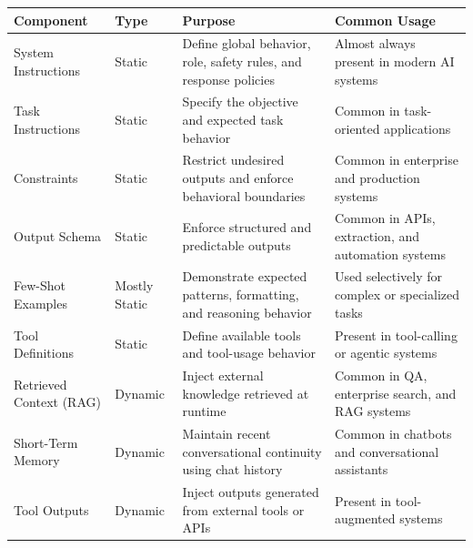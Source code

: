 \documentclass[10pt,a4paper]{article}
\begin{document}
\begin{table}[h]
\centering
\small
\begin{tabular}{|p{4cm}|p{2.5cm}|p{4.5cm}|p{3.5cm}|}
\hline

\textbf{Component} &
\textbf{Type} &
\textbf{Purpose} &
\textbf{Common Usage} \\

\hline

System Instructions &
Static &
Define global behavior, role, safety rules, and response policies &
Almost always present in modern AI systems \\

\hline

Task Instructions &
Static &
Specify the objective and expected task behavior &
Common in task-oriented applications \\

\hline

Constraints &
Static &
Restrict undesired outputs and enforce behavioral boundaries &
Common in enterprise and production systems \\

\hline

Output Schema &
Static &
Enforce structured and predictable outputs &
Common in APIs, extraction, and automation systems \\

\hline

Few-Shot Examples &
Mostly Static &
Demonstrate expected patterns, formatting, and reasoning behavior &
Used selectively for complex or specialized tasks \\

\hline

Tool Definitions &
Static &
Define available tools and tool-usage behavior &
Present in tool-calling or agentic systems \\

\hline

Retrieved Context (RAG) &
Dynamic &
Inject external knowledge retrieved at runtime &
Common in QA, enterprise search, and RAG systems \\

\hline

Short-Term Memory &
Dynamic &
Maintain recent conversational continuity using chat history &
Common in chatbots and conversational assistants \\

\hline

Tool Outputs &
Dynamic &
Inject outputs generated from external tools or APIs &
Present in tool-augmented systems \\


\end{tabular}
\end{table}
\end{document}
